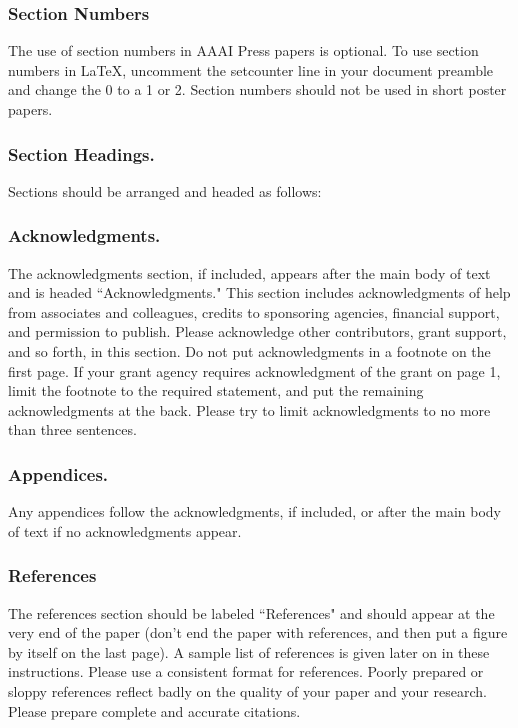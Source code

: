 \documentclass[letterpaper]{article}
\begin{document}
\subsubsection{Section Numbers}
The use of section numbers in AAAI Press papers is optional. To use section numbers in \LaTeX{}, uncomment the setcounter line in your document preamble and change the 0 to a 1 or 2. Section numbers should not be used in short poster papers.

\subsubsection{Section Headings.}
Sections should be arranged and headed as follows: 

\subsubsection{Acknowledgments.}
The acknowledgments section, if included, appears after the main body of text and is headed ``Acknowledgments." This section includes acknowledgments of help from associates and colleagues, credits to sponsoring agencies, financial support, and permission to publish. Please acknowledge other contributors, grant support, and so forth, in this section. Do not put acknowledgments in a footnote on the first page. If your grant agency requires acknowledgment of the grant on page 1, limit the footnote to the required statement, and put the remaining acknowledgments at the back. Please try to limit acknowledgments to no more than three sentences. 

\subsubsection{Appendices.}
Any appendices follow the acknowledgments, if included, or after the main body of text if no acknowledgments appear. 

\subsubsection{References}
The references section should be labeled ``References" and should appear at the very end of the paper (don't end the paper with references, and then put a figure by itself on the last page). A sample list of references is given later on in these instructions. Please use a consistent format for references. Poorly prepared or sloppy references reflect badly on the quality of your paper and your research. Please prepare complete and accurate citations.
\end{document}
